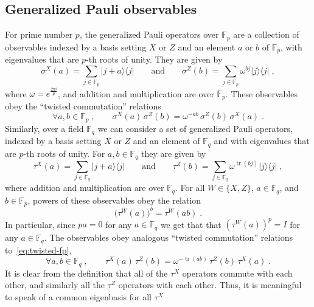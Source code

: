 \documentclass[11pt]{article}
\theoremstyle{definition}
\newcommand{\ket}[1]{|#1\rangle}
\newcommand{\bra}[1]{\langle#1|}
\newcommand{\qp}{\tau}
\newcommand{\F}{\ensuremath{\mathbb{F}}}
\newcommand{\Fp}{\F_p}
\newcommand{\Fq}{\F_q}
\DeclareMathOperator{\tr}{tr}
\begin{document}
\subsection{Generalized Pauli observables}
\label{sec:generalized-pauli}


For prime number $p$, the generalized Pauli operators over $\Fp$ are a
collection of observables indexed by a basis setting $X$ or $Z$ and an element
$a$ or $b$ of $\Fp$, with eigenvalues that are $p$-th roots of unity.
They are given by
\begin{equation}
  \label{eq:pauli-fp}
  \sigma^X(a) = \sum_{j \in \Fp} \ket{j + a} \bra{j}\qquad \text{and} \qquad
  \sigma^Z(b) = \sum_{j \in \Fp} \omega^{bj} \ket{j} \bra{j}\;,
\end{equation}
where $\omega = e^{\frac{2\pi i}{p}}$, and addition and multiplication are over
$\Fp$.
These observables obey the ``twisted commutation'' relations
\begin{equation}
  \label{eq:twisted-fp}
  \forall a,b\in\Fp\;,\qquad \sigma^X(a)\, \sigma^Z(b) =
  \omega^{-ab} \,\sigma^Z(b)\,\sigma^X(a)\;.
\end{equation}
Similarly, over a field $\Fq$ we can consider a set of generalized Pauli
operators, indexed by a basis setting $X$ or $Z$ and an element of $\Fq$ and
with eigenvalues that are $p$-th roots of unity.
For $a, b\in\Fq$ they are given by
\begin{equation*}
  \qp^X(a) = \sum_{j \in \Fq} \ket{j+a}\bra{j} \qquad \text{and} \qquad
  \qp^Z(b)= \sum_{j \in \Fq} \omega^{\tr(b j)} \ket{j}\bra{j}\;,
\end{equation*}
where addition and multiplication are over $\Fq$.
For all $W \in \{X,Z\}$, $a \in \Fq$, and $b \in \Fp$, powers of these
observables obey the relation
\begin{equation*}
  \bigl( \qp^W(a) \bigr)^b = \qp^W(a b) \;.
\end{equation*}
In particular, since $pa=0$ for any $a\in \Fq$ we get that that $(\qp^W(a))^p =
I$ for any $a\in\Fq$.
The observables obey analogous ``twisted commutation'' relations
to~\eqref{eq:twisted-fp},
\begin{equation}
  \label{eq:twisted-fq}
  \forall a, b \in \Fq\;, \qquad \qp^X(a)\, \qp^Z(b) =
  \omega^{-\tr(a b)} \, \qp^Z(b)\, \qp^X(a)\;.
\end{equation}
It is clear from the definition that all of the $\qp^X$ operators commute with
each other, and similarly all the $\qp^Z$ operators with each other.
Thus, it is meaningful to speak of a common eigenbasis for all $\qp^X$
\end{document}
